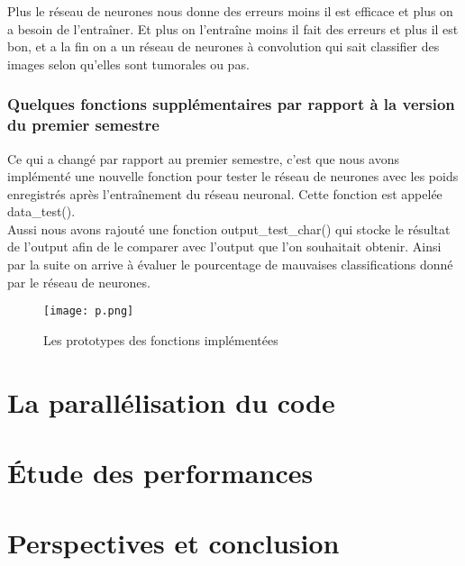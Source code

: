 \documentclass[a4paper,11pt]{report}
\theoremstyle{definition}
\begin{document}
Plus le réseau de neurones nous donne des erreurs moins il est efficace et plus on a besoin de l’entraîner. Et plus on l’entraîne moins il fait des erreurs et plus il est bon, et a la fin on a un réseau de neurones à convolution qui sait classifier des images selon qu’elles sont tumorales ou pas.



\subsection{Quelques fonctions supplémentaires par rapport à la version du premier semestre}

Ce qui a changé par rapport au premier semestre, c'est que nous avons implémenté une nouvelle fonction pour tester le réseau de neurones avec les poids enregistrés après l'entraînement du réseau neuronal. Cette fonction est appelée data\_test().\\

Aussi nous avons rajouté une fonction output\_test\_char() qui stocke le résultat de l’output afin de le comparer avec l’output que l’on souhaitait obtenir. Ainsi par la suite on arrive à évaluer le pourcentage de mauvaises classifications donné par le réseau de neurones.\\

 \begin{figure}[!htbp]
   \begin{center}
   \texttt{[image: p.png]}
   \caption{Les prototypes des fonctions implémentées}
   \end{center}
   \end{figure}

















\chapter{La parallélisation du code}


























\chapter{Étude des performances}





\chapter*{Perspectives et conclusion}





 
 
\end{document}
